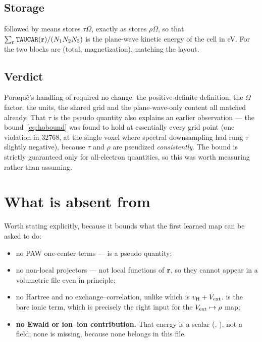 \subsection{Storage}

 followed by  means
 stores $\tau\Omega$, exactly as  stores $\rho\Omega$,
so that $\sum_{\mathbf{r}} \texttt{TAUCAR}(\mathbf{r})/(N_1N_2N_3)$ is the plane-wave kinetic
energy of the cell in eV. For  the two blocks are (total,
magnetization), matching the  layout.

\subsection{Verdict}

Poraqu\^e's handling of  required no change: the positive-definite
definition, the $\Omega$ factor, the units, the shared grid and the
plane-wave-only content all matched already. That $\tau$ is the pseudo quantity
also explains an earlier observation --- the bound~\eqref{eq:hobound} was found
to hold at essentially every grid point (one violation in $32768$, at the single
voxel where spectral downsampling had rung $\tau$ slightly negative), because
$\tau$ and $\rho$ are pseudized \emph{consistently}. The bound is strictly
guaranteed only for all-electron quantities, so this was worth measuring rather
than assuming.

\section{What is absent from \texorpdfstring{}{EXTCAR}}

Worth stating explicitly, because it bounds what the first learned map can be
asked to do:

\begin{itemize}
  \item no PAW one-center terms ---  is a pseudo quantity;
  \item no non-local projectors --- not local functions of $\mathbf{r}$, so they
    cannot appear in a volumetric file even in principle;
  \item no Hartree and no exchange--correlation, unlike  which is
    $v_{\mathrm{H}}+V_{\mathrm{ext}}$.  is the bare ionic term, which is precisely the
    right input for the $V_{\mathrm{ext}}\mapsto\rho$ map;
  \item \textbf{no Ewald or ion--ion contribution.} That energy is a scalar
    (, ), not a field; none is missing, because none
    belongs in this file.
\end{itemize}


